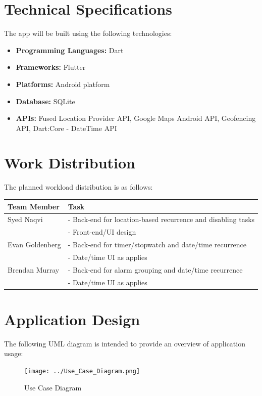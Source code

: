 \documentclass{article}
\begin{document}
\section{Technical Specifications}
The app will be built using the following technologies:
\begin{itemize}
    \item \textbf{Programming Languages:} Dart
    \item \textbf{Frameworks:} Flutter
    \item \textbf{Platforms:} Android platform
    \item \textbf{Database:} SQLite
    \item \textbf{APIs:} Fused Location Provider API, Google Maps Android API, Geofencing API, Dart:Core - DateTime API
\end{itemize}

\newpage

\section{Work Distribution}

The planned workload distribution is as follows:\\

\renewcommand{\arraystretch}{1.5} %
\begin{tabular}{|p{3cm}|p{10cm}|}
    \hline
    \textbf{Team Member} & \textbf{Task} \\
    \hline
    Syed Naqvi        & - Back-end for location-based recurrence and disabling tasks\\
                      & - Front-end/UI design\\
    \hline
    Evan Goldenberg   & - Back-end for timer/stopwatch and date/time recurrence\\
                      & - Date/time UI as applies\\
    \hline
    Brendan Murray    & - Back-end for alarm grouping and date/time recurrence\\
                      & - Date/time UI as applies\\
    \hline
\end{tabular}

\section{Application Design}
The following UML diagram is intended to provide an overview of application usage:
\begin{figure}[h!]
    \centering
    \texttt{[image: ../Use\_Case\_Diagram.png]}
    \caption{Use Case Diagram}
\end{figure}
\end{document}
